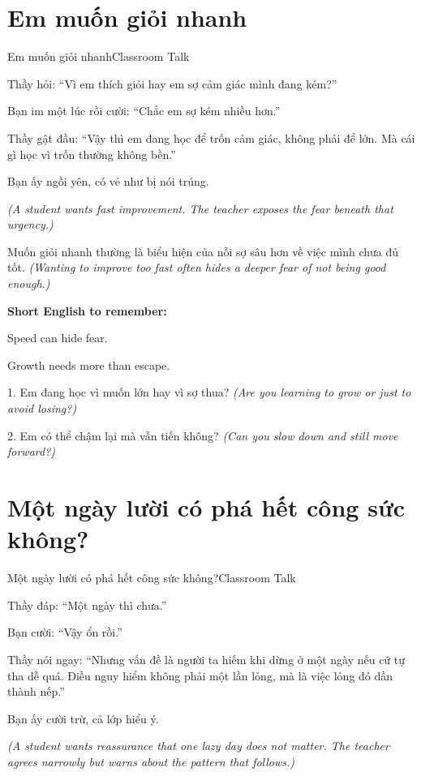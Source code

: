 \section{Em muốn giỏi nhanh}
\begin{truyen}{Em muốn giỏi nhanh}{Classroom Talk}

Thầy hỏi: ``Vì em thích giỏi hay em sợ cảm giác mình đang kém?''

Bạn im một lúc rồi cười: ``Chắc em sợ kém nhiều hơn.''

Thầy gật đầu: ``Vậy thì em đang học để trốn cảm giác, không phải để lớn. Mà cái gì học vì trốn thường không bền.''

Bạn ấy ngồi yên, có vẻ như bị nói trúng.

\textit{(A student wants fast improvement. The teacher exposes the fear beneath that urgency.)}
\end{truyen}

\begin{baihoc}
Muốn giỏi nhanh thường là biểu hiện của nỗi sợ sâu hơn về việc mình chưa đủ tốt.
\textit{(Wanting to improve too fast often hides a deeper fear of not being good enough.)}
\end{baihoc}

\begin{ghinhoanh}
\textbf{Short English to remember:}

Speed can hide fear.

Growth needs more than escape.
\end{ghinhoanh}

\begin{tuhocnhanh}
1. Em đang học vì muốn lớn hay vì sợ thua? \textit{(Are you learning to grow or just to avoid losing?)}

2. Em có thể chậm lại mà vẫn tiến không? \textit{(Can you slow down and still move forward?)}
\end{tuhocnhanh}
\ngancach

\section{Một ngày lười có phá hết công sức không?}
\begin{truyen}{Một ngày lười có phá hết công sức không?}{Classroom Talk}

Thầy đáp: ``Một ngày thì chưa.''

Bạn cười: ``Vậy ổn rồi.''

Thầy nói ngay: ``Nhưng vấn đề là người ta hiếm khi dừng ở một ngày nếu cứ tự tha dễ quá. Điều nguy hiểm không phải một lần lỏng, mà là việc lỏng đó dần thành nếp.''

Bạn ấy cười trừ, cả lớp hiểu ý.

\textit{(A student wants reassurance that one lazy day does not matter. The teacher agrees narrowly but warns about the pattern that follows.)}
\end{truyen}

